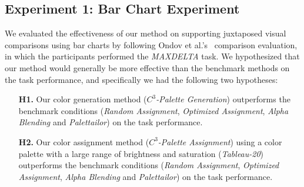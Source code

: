 \subsection{Experiment 1: Bar Chart Experiment}
\label{subsec:barchartExp}
We evaluated the effectiveness of our method on supporting juxtaposed visual comparisons using bar charts by following Ondov et al.'s~\cite{Ondov19} comparison evaluation, in which the participants performed the \emph{MAXDELTA} task.
We hypothesized that our method would generally be more effective than the benchmark methods on the task performance, and specifically we had the following two hypotheses:
\begin{itemize}[noitemsep]
\setlength{\itemsep}{5pt}
    \item[\textbf{H1.}] Our color generation method (\emph{$C^3$-Palette Generation}) outperforms the benchmark conditions (\emph{Random Assignment}, \emph{Optimized Assignment}, \emph{Alpha Blending} and \emph{Palettailor}) on the task performance.
    \item [\textbf{H2.}] Our color assignment method (\emph{$C^3$-Palette Assignment}) using a color palette with a large range of brightness and saturation (\emph{Tableau-20}) outperforms the benchmark conditions (\emph{Random Assignment}, \emph{Optimized Assignment}, \emph{Alpha Blending} and \emph{Palettailor}) on the task performance.
\end{itemize}

